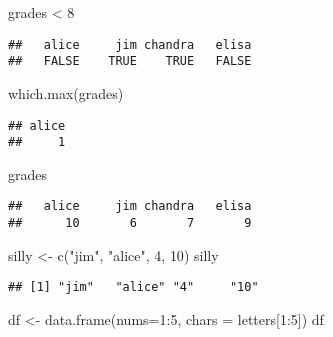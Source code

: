 \documentclass[
]{article}
\newenvironment{Shaded}{\begin{snugshade}}{\end{snugshade}}
\newcommand{\AttributeTok}[1]{\textcolor[rgb]{0.77,0.63,0.00}{#1}}
\newcommand{\DecValTok}[1]{\textcolor[rgb]{0.00,0.00,0.81}{#1}}
\newcommand{\FunctionTok}[1]{\textcolor[rgb]{0.00,0.00,0.00}{#1}}
\newcommand{\NormalTok}[1]{#1}
\newcommand{\OtherTok}[1]{\textcolor[rgb]{0.56,0.35,0.01}{#1}}
\newcommand{\SpecialCharTok}[1]{\textcolor[rgb]{0.00,0.00,0.00}{#1}}
\newcommand{\StringTok}[1]{\textcolor[rgb]{0.31,0.60,0.02}{#1}}
\begin{document}
\begin{Shaded}
\begin{Highlighting}[]
\NormalTok{grades }\SpecialCharTok{\textless{}} \DecValTok{8}
\end{Highlighting}
\end{Shaded}

\begin{verbatim}
##   alice     jim chandra   elisa 
##   FALSE    TRUE    TRUE   FALSE
\end{verbatim}

\begin{Shaded}
\begin{Highlighting}[]
\FunctionTok{which.max}\NormalTok{(grades)}
\end{Highlighting}
\end{Shaded}

\begin{verbatim}
## alice 
##     1
\end{verbatim}

\begin{Shaded}
\begin{Highlighting}[]
\NormalTok{grades}
\end{Highlighting}
\end{Shaded}

\begin{verbatim}
##   alice     jim chandra   elisa 
##      10       6       7       9
\end{verbatim}

\begin{Shaded}
\begin{Highlighting}[]
\NormalTok{silly }\OtherTok{\textless{}{-}}  \FunctionTok{c}\NormalTok{(}\StringTok{"jim"}\NormalTok{, }\StringTok{"alice"}\NormalTok{, }\DecValTok{4}\NormalTok{, }\DecValTok{10}\NormalTok{)}
\NormalTok{silly}
\end{Highlighting}
\end{Shaded}

\begin{verbatim}
## [1] "jim"   "alice" "4"     "10"
\end{verbatim}

\begin{Shaded}
\begin{Highlighting}[]
\NormalTok{df }\OtherTok{\textless{}{-}}  \FunctionTok{data.frame}\NormalTok{(}\AttributeTok{nums=}\DecValTok{1}\SpecialCharTok{:}\DecValTok{5}\NormalTok{, }\AttributeTok{chars =}\NormalTok{ letters[}\DecValTok{1}\SpecialCharTok{:}\DecValTok{5}\NormalTok{])}
\NormalTok{df }
\end{Highlighting}
\end{Shaded}
\end{document}
